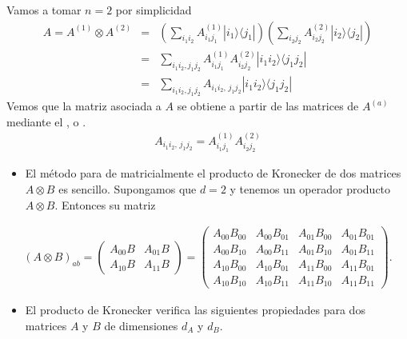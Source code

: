 \documentclass[letterpaper,10pt,english]{jupyterBook}
\newcommand{\bra}[1]{\langle #1|}
\newcommand{\ket}[1]{|#1\rangle}
\begin{document}
\sphinxAtStartPar
Vamos a tomar  \(n=2\) por simplicidad
\begin{eqnarray*}
A = A^{(1)}\otimes  A^{(2)} &=&\left( \sum_{i_1i_2}A^{(1)}_{i_1 j_1} \ket{i_1}\bra{j_1}\right)\left( \sum_{i_2j_2}A^{(2)}_{i_2 j_2} \ket{i_2}\bra{j_2}\right)\\
&=& \sum_{i_1 i_2 , j_1 j_2} A^{(1)}_{i_1 j_1}A^{(2)}_{i_2 j_2}\ket{i_1 i_2}\bra{j_1j_2} \\
&=& \sum_{i_1 i_2 , j_1 j_2} A_{i_1i_2,\, j_1j_2}\ket{i_1 i_2}\bra{j_1j_2}
\end{eqnarray*}
\sphinxAtStartPar
Vemos que la matriz asociada a \(A\) se obtiene  a partir de las matrices de \(A^{(a)}\) mediante el  , o .
\begin{equation*}
\begin{split}
  A_{i_1i_2,\,j_1j_2} = A^{(1)}_{i_1j_1}A^{(2)}_{i_2 j_2} 
\end{split}
\end{equation*}\begin{itemize}
\item {} 
\sphinxAtStartPar
El método para de  matricialmente el producto de Kronecker de dos matrices \(A\otimes B\) es sencillo. Supongamos que \(d=2\) y tenemos un operador producto \(A\otimes B\). Entonces su matriz

\end{itemize}
\begin{equation*}
\begin{split}
(A\otimes B)_{ab} = \begin{pmatrix} A_{00}B & A_{01}B \\ A_{10}B & A_{11}B \end{pmatrix} = \begin{pmatrix} A_{00}B_{00} & A_{00}B_{01} & A_{01}B_{00} & A_{01}B_{01} \\
                A_{00}B_{10} & A_{00}B_{11} & A_{01}B_{10} & A_{01}B_{11} \\
                A_{10}B_{00} & A_{10}B_{01} & A_{11}B_{00} & A_{11}B_{01} \\
                A_{10}B_{10} & A_{10}B_{11} & A_{11}B_{10} & A_{11}B_{11} \end{pmatrix}.
\end{split}
\end{equation*}\begin{itemize}
\item {} 
\sphinxAtStartPar
El producto de Kronecker verifica las siguientes propiedades para dos matrices \(A\)  y \(B\) de dimensiones \(d_A\) y \(d_B\).

\end{itemize}
\end{document}
